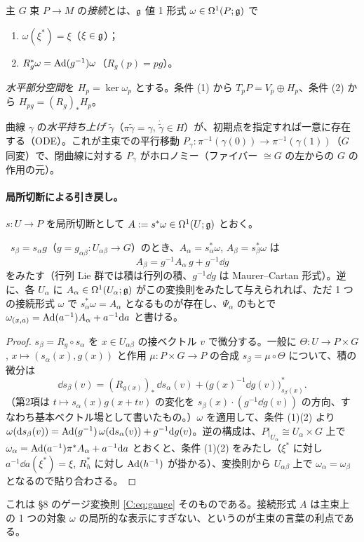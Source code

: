\begin{defn}[主束の接続]\label{C:def:Pconn}
主 $G$ 束 $P\to M$ の\emph{接続}とは、$\mathfrak g$ 値 1 形式 $\omega\in\Omega^1(P;\mathfrak g)$ で
\begin{enumerate}
\item $\omega(\xi^*)=\xi$（$\xi\in\mathfrak g$）；
\item $R_g^*\omega=\mathrm{Ad}(g^{-1})\omega$（$R_g(p)=pg$）。
\end{enumerate}
\emph{水平部分空間}を $H_p=\ker\omega_p$ とする。条件 (1) から $T_pP=V_p\oplus H_p$、条件 (2) から $H_{pg}=(R_g)_*H_p$。
\end{defn}
曲線 $\gamma$ の\emph{水平持ち上げ} $\tilde\gamma$（$\pi\tilde\gamma=\gamma$, $\dot{\tilde\gamma}\in H$）が、初期点を指定すれば一意に存在する（ODE）。これが主束での平行移動 $P_\gamma:\pi^{-1}(\gamma(0))\to\pi^{-1}(\gamma(1))$（$G$ 同変）で、閉曲線に対する $P_\gamma$ がホロノミー（ファイバー $\cong G$ の左からの $G$ の作用の元）。

\paragraph{局所切断による引き戻し。}$s:U\to P$ を局所切断として $A:=s^*\omega\in\Omega^1(U;\mathfrak g)$ とおく。

\begin{prop}\label{C:prop:Pgauge}\tP\
$s_\beta=s_\alpha g$（$g=g_{\alpha\beta}:U_{\alpha\beta}\to G$）のとき、$A_\alpha=s_\alpha^*\omega$, $A_\beta=s_\beta^*\omega$ は
\[
A_\beta=g^{-1}A_\alpha\,g+g^{-1}\dd g
\]
をみたす（行列 Lie 群では積は行列の積、$g^{-1}\dd g$ は Maurer--Cartan 形式）。逆に、各 $U_\alpha$ に $A_\alpha\in\Omega^1(U_\alpha;\mathfrak g)$ がこの変換則をみたして与えられれば、ただ 1 つの接続形式 $\omega$ で $s_\alpha^*\omega=A_\alpha$ となるものが存在し、$\Psi_\alpha$ のもとで $\omega_{(x,a)}=\mathrm{Ad}(a^{-1})A_\alpha+a^{-1}\mathrm{d} a$ と書ける。
\end{prop}
\begin{proof}
$s_\beta=R_g\circ s_\alpha$ を $x\in U_{\alpha\beta}$ の接ベクトル $v$ で微分する。一般に $\Theta:U\to P\times G$, $x\mapsto(s_\alpha(x),g(x))$ と作用 $\mu:P\times G\to P$ の合成 $s_\beta=\mu\circ\Theta$ について、積の微分は
\[
\dd s_\beta(v)=(R_{g(x)})_*\,\dd s_\alpha(v)+\bigl(g(x)^{-1}\dd g(v)\bigr)^*_{s_\beta(x)}.
\]
（第2項は $t\mapsto s_\alpha(x)g(x+tv)$ の変化を $s_\beta(x)\cdot(g^{-1}\dd g(v))$ の方向、すなわち基本ベクトル場として書いたもの。）$\omega$ を適用して、条件 (1)(2) より
$\omega(\mathrm{d} s_\beta(v))=\mathrm{Ad}(g^{-1})\,\omega(\mathrm{d} s_\alpha(v))+g^{-1}\mathrm{d} g(v)$。逆の構成は、$P|_{U_\alpha}\cong U_\alpha\times G$ 上で $\omega_\alpha=\mathrm{Ad}(a^{-1})\pi^*A_\alpha+a^{-1}\mathrm{d} a$ とおくと、条件 (1)(2) をみたし（$\xi^*$ に対し $a^{-1}\dd a(\xi^*)=\xi$, $R_h^*$ に対し $\mathrm{Ad}(h^{-1})$ が掛かる）、変換則から $U_{\alpha\beta}$ 上で $\omega_\alpha=\omega_\beta$ となるので貼り合わさる。
\end{proof}
これは §8 のゲージ変換則 \eqref{C:eq:gauge} そのものである。接続形式 $A$ は主束上の 1 つの対象 $\omega$ の局所的な表示にすぎない、というのが主束の言葉の利点である。

